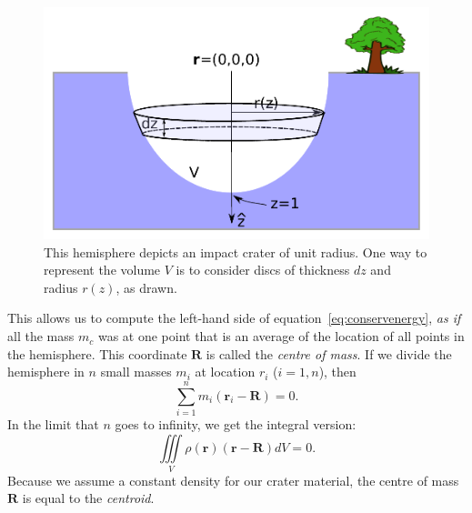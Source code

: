 \documentclass[addpoints]{exam}
\begin{document}
\begin{figure}[h]
  \includegraphics[width=\columnwidth]{crater1}
  \caption{This hemisphere depicts an impact crater of unit
    radius. One way to represent the volume $V$ is to consider discs
    of thickness $dz$ and radius $r(z)$, as drawn.}
  \label{fig:crater}
\end{figure}

This allows us to compute the left-hand side of
equation~\ref{eq:conservenergy}, {\it as if} all the mass $m_c$ was at
one point that is an average of the location of all points in the
hemisphere. This coordinate $\mathbf{R}$ is called the {\it centre of
  mass}. If we divide the hemisphere in $n$ small masses $m_i$ at
location $r_i$ ($i=1,n$), then
\begin{equation}
  \sum _{i=1}^{n}m_{i}(\mathbf {r} _{i}-\mathbf {R} )=0.
  \label{eq:discretecentreofmass}
\end{equation}
In the limit that $n$ goes to infinity, we get the integral version:
\begin{equation} 
  \iiint \limits _{V}\rho (\mathbf {r} )(\mathbf {r} -\mathbf {R} )dV=0.
  \label{eq:integralcentreofmass}
\end{equation}
Because we assume a constant density for our crater material, the
centre of mass $\mathbf{R}$ is equal to the {\it centroid}.
\end{document}
